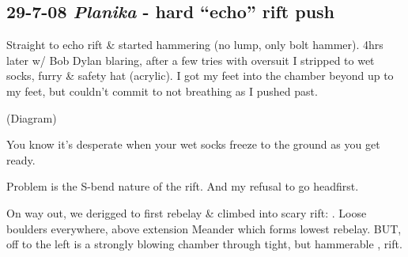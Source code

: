 \subsection{\texorpdfstring{29-7-08 \emph{Planika} - hard ``echo'' rift
push}{29-7-08 Planika - hard ``echo'' rift push}}


Straight to echo rift \& started hammering (no lump, only bolt hammer).
4hrs later w/ Bob Dylan blaring, after a few tries with oversuit I
stripped to wet socks, furry \& safety hat (acrylic). I got my feet into
the chamber beyond up to my feet, but couldn't commit to not breathing
as I pushed past.

(Diagram)

You know it's desperate when your wet socks freeze to the ground as you
get ready.

Problem is the S-bend nature of the rift. And my refusal to go
headfirst.

On way out, we derigged to first rebelay \& climbed into scary rift:
. Loose boulders everywhere, above extension
Meander which forms lowest rebelay. BUT, off to the left is a strongly
blowing chamber through tight, but hammerable , rift.


